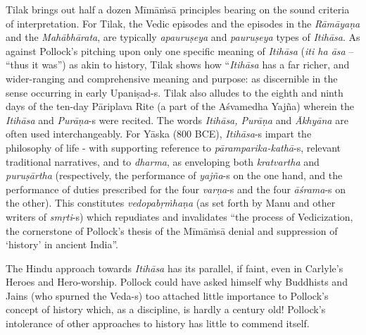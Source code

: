 Tilak brings out half a dozen Mīmāṁsā principles bearing on the sound criteria of interpretation. For Tilak, the Vedic episodes and the episodes in the \textit{Rāmāyaṇa} and the \textit{Mahābhārata}, are typically \textit{apauruṣeya} and \textit{pauruṣeya} types of \textit{Itihāsa}. As against Pollock’s pitching upon only one specific meaning of \textit{Itihāsa} (\textit{iti ha āsa} – ``thus it was'') as akin to history, Tilak shows how “\textit{Itihāsa} has a far richer, and wider-ranging and comprehensive meaning and purpose: as discernible in the sense occurring in early Upaniṣad-s. Tilak also alludes to the eighth and ninth days of the ten-day Pāriplava Rite (a part of the Aśvamedha Yajña) wherein the \textit{Itihāsa} and \textit{Purāṇa}-s were recited. The words \textit{Itihāsa, Purāṇa} and \textit{Ākhyāna} are often used interchangeably. For Yāska (800 BCE), \textit{Itihāsa}-s impart the philosophy of life - with supporting reference to \textit{pāramparika-kathā}-s, relevant traditional narratives, and to \textit{dharma}, as enveloping both \textit{kratvartha} and \textit{puruṣārtha} (respectively, the performance of \textit{yajña}-s on the one hand, and the performance of duties prescribed for the four \textit{varṇa}-s and the four \textit{āśrama}-s on the other). This constitutes \textit{vedopabṛṁhaṇa} (as set forth by Manu and other writers of \textit{smṛti}-s) which repudiates and invalidates ``the process of Vedicization, the cornerstone of Pollock’s thesis of the Mīmāṁsā denial and suppression of ‘history’ in ancient India”. 

The Hindu approach towards \textit{Itihāsa} has its parallel, if faint, even in Carlyle’s Heroes and Hero-worship. Pollock could have asked himself why Buddhists and Jains (who spurned the Veda-s) too attached little importance to Pollock’s concept of history which, as a discipline, is hardly a century old! Pollock’s intolerance of other approaches to history has little to commend itself.

